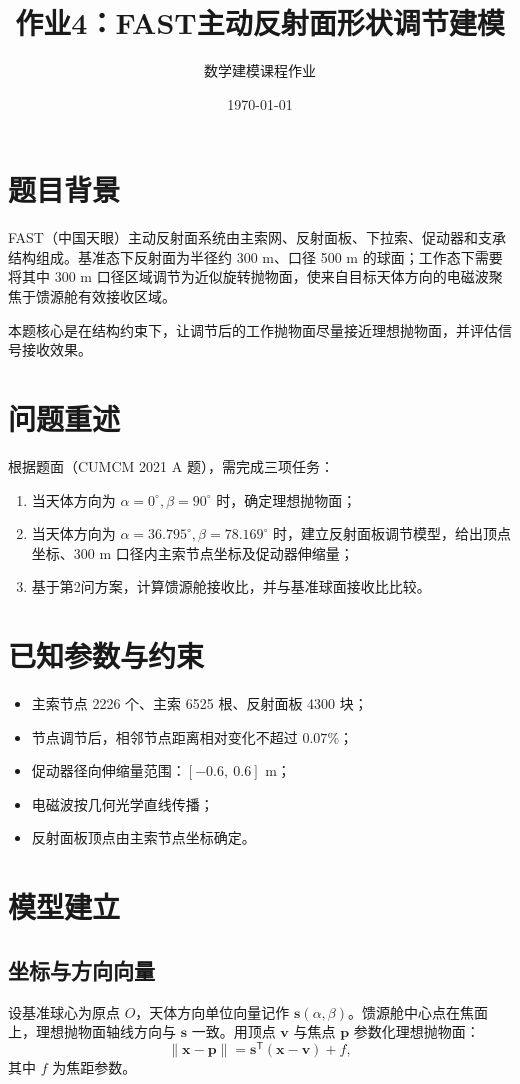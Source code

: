 \documentclass[12pt,a4paper]{ctexart}
\title{作业4：FAST主动反射面形状调节建模}
\author{数学建模课程作业}
\date{\today}
\begin{document}
\maketitle

\section{题目背景}
FAST（中国天眼）主动反射面系统由主索网、反射面板、下拉索、促动器和支承结构组成。基准态下反射面为半径约 300 m、口径 500 m 的球面；工作态下需要将其中 300 m 口径区域调节为近似旋转抛物面，使来自目标天体方向的电磁波聚焦于馈源舱有效接收区域。

本题核心是在结构约束下，让调节后的工作抛物面尽量接近理想抛物面，并评估信号接收效果。

\section{问题重述}
根据题面（CUMCM 2021 A 题），需完成三项任务：
\begin{enumerate}
  \item 当天体方向为 $\alpha=0^\circ,\beta=90^\circ$ 时，确定理想抛物面；
  \item 当天体方向为 $\alpha=36.795^\circ,\beta=78.169^\circ$ 时，建立反射面板调节模型，给出顶点坐标、300 m 口径内主索节点坐标及促动器伸缩量；
  \item 基于第2问方案，计算馈源舱接收比，并与基准球面接收比比较。
\end{enumerate}

\section{已知参数与约束}
\begin{itemize}
  \item 主索节点 2226 个、主索 6525 根、反射面板 4300 块；
  \item 节点调节后，相邻节点距离相对变化不超过 $0.07\%$；
  \item 促动器径向伸缩量范围：$[-0.6,\ 0.6]$ m；
  \item 电磁波按几何光学直线传播；
  \item 反射面板顶点由主索节点坐标确定。
\end{itemize}

\section{模型建立}
\subsection{坐标与方向向量}
设基准球心为原点 $O$，天体方向单位向量记作 $\mathbf s(\alpha,\beta)$。馈源舱中心点在焦面上，理想抛物面轴线方向与 $\mathbf s$ 一致。用顶点 $\mathbf v$ 与焦点 $\mathbf p$ 参数化理想抛物面：
\[
\|\mathbf x-\mathbf p\|=\mathbf s^\mathsf T(\mathbf x-\mathbf v)+f,
\]
其中 $f$ 为焦距参数。
\end{document}
